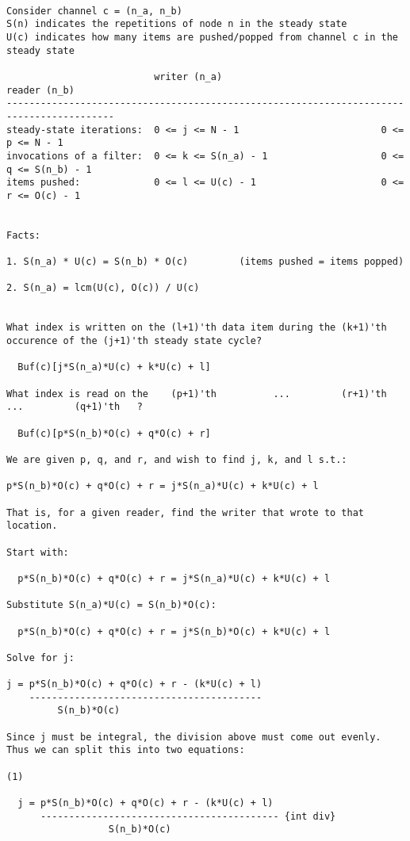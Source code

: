 \begin{verbatim}

Consider channel c = (n_a, n_b)
S(n) indicates the repetitions of node n in the steady state
U(c) indicates how many items are pushed/popped from channel c in the steady state

                          writer (n_a)                            reader (n_b)
-----------------------------------------------------------------------------------------
steady-state iterations:  0 <= j <= N - 1                         0 <= p <= N - 1
invocations of a filter:  0 <= k <= S(n_a) - 1                    0 <= q <= S(n_b) - 1
items pushed:             0 <= l <= U(c) - 1                      0 <= r <= O(c) - 1


Facts:

1. S(n_a) * U(c) = S(n_b) * O(c)         (items pushed = items popped)

2. S(n_a) = lcm(U(c), O(c)) / U(c)


What index is written on the (l+1)'th data item during the (k+1)'th occurence of the (j+1)'th steady state cycle?

  Buf(c)[j*S(n_a)*U(c) + k*U(c) + l]

What index is read on the    (p+1)'th          ...         (r+1)'th      ...         (q+1)'th   ?

  Buf(c)[p*S(n_b)*O(c) + q*O(c) + r]

We are given p, q, and r, and wish to find j, k, and l s.t.:

p*S(n_b)*O(c) + q*O(c) + r = j*S(n_a)*U(c) + k*U(c) + l

That is, for a given reader, find the writer that wrote to that
location.

Start with:

  p*S(n_b)*O(c) + q*O(c) + r = j*S(n_a)*U(c) + k*U(c) + l

Substitute S(n_a)*U(c) = S(n_b)*O(c):

  p*S(n_b)*O(c) + q*O(c) + r = j*S(n_b)*O(c) + k*U(c) + l

Solve for j:

j = p*S(n_b)*O(c) + q*O(c) + r - (k*U(c) + l)
    -----------------------------------------
         S(n_b)*O(c)

Since j must be integral, the division above must come out evenly.  Thus we can split this into two equations:

(1)

  j = p*S(n_b)*O(c) + q*O(c) + r - (k*U(c) + l)            
      ------------------------------------------ {int div} 
                  S(n_b)*O(c)


\end{verbatim}
